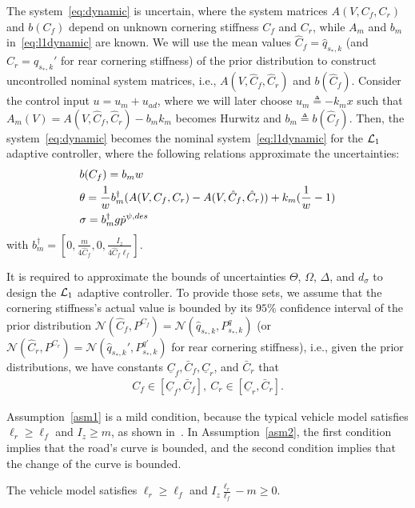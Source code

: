 \documentclass[letterpaper, 10 pt, conference]{ieeeconf}
\begin{document}
The system~\eqref{eq:dynamic} is uncertain, where the system matrices $A(V,C_f,C_r)$ and $b(C_f)$ depend on unknown cornering stiffness $C_f$ and $C_r$, while $A_m$ and $b_m$ in~\eqref{eq:l1dynamic} are known.
We will use the mean values $\hat{C}_f = \hat{q}_{s_*,k}$ (and $\hat{C}_r=\hat{q}_{s_*,k}'$ for rear cornering stiffness) of the prior distribution to construct uncontrolled nominal system matrices, i.e., $A(V,\hat{C}_f,\hat{C}_r)$ and $b(\hat{C}_f)$.
Consider the control input $u = u_{m} + u_{ad}$, where we will later choose $u_{m} \triangleq -k_m x$ such that $A_m(V) = A(V,\hat{C}_f,\hat{C}_r)-b_m k_m$ becomes Hurwitz and $b_m \triangleq b(\hat{C}_f)$.
Then, the system~\eqref{eq:dynamic} becomes the nominal system~\eqref{eq:l1dynamic} for the $\mathcal{L}_1$ adaptive controller, where the following relations approximate the uncertainties:
\begin{align}
    &b(C_f)=b_m w\nonumber\\
    &\theta = \frac{1}{w}b_m^\dagger(A(V,C_f,C_r)-A(V,\hat{C}_f,\hat{C}_r)) + k_m (\frac{1}{w}-1)\nonumber\\
    &\sigma = b_m^\dagger g \dot{p}^{\psi,des}
    \label{app:model}
\end{align}
with $b_m^\dagger = [0, \frac{m}{4\hat{C}_f},0,\frac{I_z}{4\hat{C}_f\ell_f}]$.

It is required to approximate the bounds of uncertainties $\Theta$, $\Omega$, $\Delta$, and $d_\sigma$ to design the $\mathcal{L}_1$ adaptive controller. To provide those sets, we assume that the cornering stiffness's actual value is bounded by its $95\%$ confidence interval of the prior distribution $\mathcal{N}(\hat{C}_f,P^{C_f}) = \mathcal{N}(\hat{q}_{s_*,k},P_{s_*,k}^q)$ (or $\mathcal{N}(\hat{C}_r,P^{C_r}) = \mathcal{N}(\hat{q}_{s_*,k}',P_{s_*,k}^{q'})$ for rear cornering stiffness), i.e., given the prior distributions, we have constants $\underline{C}_f,\bar{C}_f, \underline{C}_r$, and $\bar{C}_r$ that
\begin{align}
    C_f \in [\underline{C}_f,\bar{C}_f], \ 
    C_r\in [\underline{C}_r,\bar{C}_r].
\label{app:C}
\end{align}

Assumption~\ref{asm1} is a mild condition, because the typical vehicle model satisfies $\ell_r\geq \ell_f$ and $I_z \geq m$, as shown in~\cite{rajamani2011vehicle}. In Assumption~\ref{asm2}, the first condition implies that the road's curve is bounded, and the second condition implies that the change of the curve is bounded.


\begin{assumption} The vehicle model satisfies $\ell_r\geq \ell_f$ and $I_z\frac{\ell_r}{\ell_f}-m\geq0$.
\label{asm1}
\end{assumption}
\end{document}
